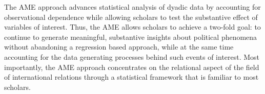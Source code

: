 The AME approach advances statistical analysis of dyadic data by accounting for observational dependence while allowing scholars to test the substantive effect of variables of interest. Thus, the AME allows scholars to achieve a two-fold goal: to continue to generate meaningful, substantive insights about political phenomena without abandoning a regression based approach, while at the same time accounting for the data generating processes behind such events of interest. Most importantly, the AME approach concentrates on the relational aspect of the field of international relations through a statistical framework that is familiar to most scholars.
